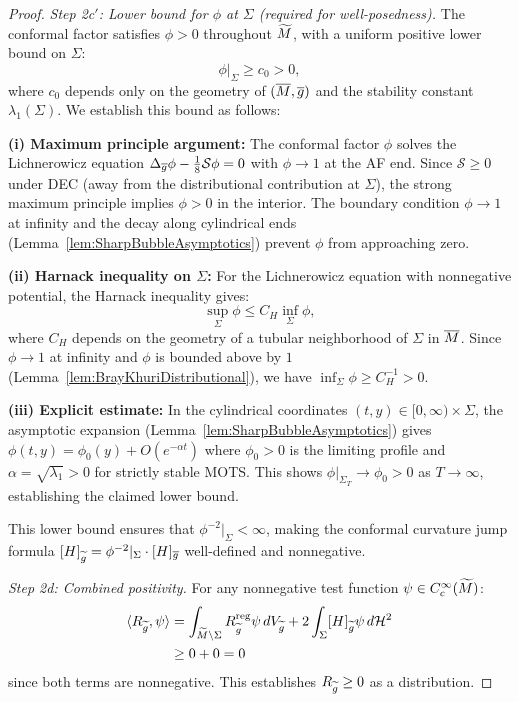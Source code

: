 \begin{proof}
\textit{Step 2c$'$: Lower bound for $\phi$ at $\Sigma$ (required for well-posedness).}
The conformal factor satisfies $\phi > 0$ throughout $\widetilde{M}$, with a uniform positive lower bound on $\Sigma$:
\begin{equation}\label{eq:PhiLowerBound}
    \phi|_\Sigma \ge c_0 > 0,
\end{equation}
where $c_0$ depends only on the geometry of $(\overline{M}, \overline{g})$ and the stability constant $\lambda_1(\Sigma)$. We establish this bound as follows:

\textbf{(i) Maximum principle argument:} The conformal factor $\phi$ solves the Lichnerowicz equation $\Delta_{\overline{g}}\phi - \frac{1}{8}\mathcal{S}\phi = 0$ with $\phi \to 1$ at the AF end. Since $\mathcal{S} \ge 0$ under DEC (away from the distributional contribution at $\Sigma$), the strong maximum principle implies $\phi > 0$ in the interior. The boundary condition $\phi \to 1$ at infinity and the decay along cylindrical ends (Lemma~\ref{lem:SharpBubbleAsymptotics}) prevent $\phi$ from approaching zero.

\textbf{(ii) Harnack inequality on $\Sigma$:} For the Lichnerowicz equation with nonnegative potential, the Harnack inequality gives:
\begin{equation}
    \sup_{\Sigma} \phi \le C_H \inf_{\Sigma} \phi,
\end{equation}
where $C_H$ depends on the geometry of a tubular neighborhood of $\Sigma$ in $\overline{M}$. Since $\phi \to 1$ at infinity and $\phi$ is bounded above by $1$ (Lemma~\ref{lem:BrayKhuriDistributional}), we have $\inf_\Sigma \phi \ge C_H^{-1} > 0$.

\textbf{(iii) Explicit estimate:} In the cylindrical coordinates $(t, y) \in [0,\infty) \times \Sigma$, the asymptotic expansion (Lemma~\ref{lem:SharpBubbleAsymptotics}) gives $\phi(t,y) = \phi_0(y) + O(e^{-\alpha t})$ where $\phi_0 > 0$ is the limiting profile and $\alpha = \sqrt{\lambda_1} > 0$ for strictly stable MOTS. This shows $\phi|_{\Sigma_T} \to \phi_0 > 0$ as $T \to \infty$, establishing the claimed lower bound.

This lower bound ensures that $\phi^{-2}|_\Sigma < \infty$, making the conformal curvature jump formula $[H]_{\widetilde{g}} = \phi^{-2}|_\Sigma \cdot [H]_{\overline{g}}$ well-defined and nonnegative.

\textit{Step 2d: Combined positivity.}
For any nonnegative test function $\psi \in C^\infty_c(\widetilde{M})$:
\begin{align*}
    \langle R_{\widetilde{g}}, \psi \rangle &= \int_{\widetilde{M} \setminus \Sigma} R_{\widetilde{g}}^{\mathrm{reg}} \psi \, dV_{\widetilde{g}} + 2 \int_\Sigma [H]_{\widetilde{g}} \psi \, d\mathcal{H}^2 \\
    &\ge 0 + 0 = 0
\end{align*}
since both terms are nonnegative. This establishes $R_{\widetilde{g}} \ge 0$ as a distribution.


\end{proof}
